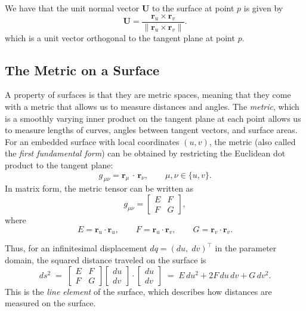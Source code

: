 \documentclass[12pt]{article}
\begin{document}
We have that the unit normal vector $\mathbf{U}$ to the surface at point $p$ is given by
\[
\mathbf{U} = \frac{\mathbf{r}_u\times\mathbf{r}_v}{\|\mathbf{r}_u\times\mathbf{r}_v\|}.
\]
which is a unit vector orthogonal to the tangent plane at point $p$.

\subsection{The Metric on a Surface}
A property of surfaces is that they are metric spaces, meaning that they come with a metric that allows us to measure distances and angles.
The \emph{metric}, which is a smoothly varying inner product on the tangent plane at each point allows us to measure lengths of curves, angles between tangent vectors, and surface areas. 
For an embedded surface with local coordinates $(u,v)$, the metric (also called the \emph{first fundamental form}) can be obtained by restricting the Euclidean dot product to the tangent plane:
\[
g_{\,\mu\nu} = \mathbf{r}_\mu\,\cdot\,\mathbf{r}_\nu, \qquad \mu,\nu \in \{u,v\}.
\]
In matrix form, the metric tensor can be written as 
\[
g_{\mu\nu} = 
\begin{bmatrix}
E & F\\[1ex]
F & G
\end{bmatrix},
\] 
where 
\begin{equation}\label{eq:metric-coefficients}
	E = \mathbf{r}_u\cdot \mathbf{r}_u, \qquad F = \mathbf{r}_u\cdot \mathbf{r}_v, \qquad G = \mathbf{r}_v\cdot \mathbf{r}_v.
\end{equation}

Thus, for an infinitesimal displacement $dq = (du,\;dv)^\top$ in the parameter domain, the squared distance traveled on the surface is 
\begin{equation}\label{eq:line-element}
ds^{2} \;=\; \begin{bmatrix}
	E & F\\[1ex]
	F & G
\end{bmatrix} \begin{bmatrix}
	du\\[1ex]
	dv
\end{bmatrix} \cdot \begin{bmatrix}
	du\\[1ex]
	dv
\end{bmatrix} \;=\; E\,du^{2} + 2F\,du\,dv + G\,dv^{2}.
\end{equation}
This is the \emph{line element} of the surface, which describes how distances are measured on the surface.
\end{document}
